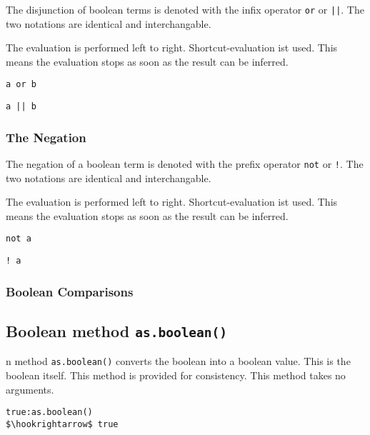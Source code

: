 \documentclass[11pt,a4paper]{scrbook}
\begin{document}
The disjunction of boolean terms is denoted with the infix operator \verb|or|
or \verb'||'. The two notations are identical and interchangable.

The evaluation is performed left to right. Shortcut-evaluation ist used. This
means the evaluation stops as soon as the result can be inferred.

\begin{lstlisting}[language=BibTool]
a or b
\end{lstlisting}

\begin{lstlisting}[language=BibTool]
a || b
\end{lstlisting}

\subsubsection{The Negation}

The negation of a boolean term is denoted with the prefix operator \verb|not|
or \verb|!|. The two notations are identical and interchangable.

The evaluation is performed left to right. Shortcut-evaluation ist used. This
means the evaluation stops as soon as the result can be inferred.

\begin{lstlisting}[language=BibTool]
not a
\end{lstlisting}

\begin{lstlisting}[language=BibTool]
! a
\end{lstlisting}

\subsubsection{Boolean Comparisons}




\subsection{Boolean method \texttt{as.boolean()}}
n method \texttt{as.boolean()} converts the boolean into a boolean
value. This is the boolean itself. This method is provided for consistency.
This method takes no arguments.

\begin{lstlisting}[language=BibTool,mathescape=true]
true:as.boolean()
$\hookrightarrow$ true
\end{lstlisting}
\end{document}

